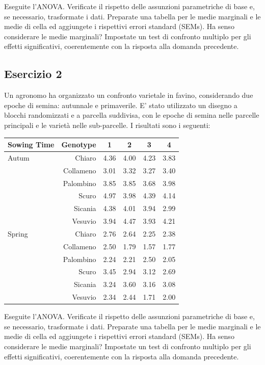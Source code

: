 \documentclass[a4paper,12pt,oneside]{book}
\begin{document}
Eseguite l'ANOVA. Verificate il rispetto delle assunzioni parametriche di base e, se necessario, trasformate i dati. Preparate una tabella per le medie marginali e le medie di cella ed aggiungete i rispettivi errori standard (SEMs). Ha senso considerare le medie marginali? Impostate un test di confronto multiplo per gli effetti significativi, coerentemente con la risposta alla domanda precedente.

\hypertarget{esercizio-2-8}{%
\subsection{Esercizio 2}\label{esercizio-2-8}}

Un agronomo ha organizzato un confronto varietale in favino, considerando due epoche di semina: autunnale e primaverile. E' stato utilizzato un disegno a blocchi randomizzati e a parcella suddivisa, con le epoche di semina nelle parcelle principali e le varietà nelle sub-parcelle. I risultati sono i seguenti:

\begin{longtable}[]{@{}lrcccc@{}}
\toprule
Sowing Time & Genotype & 1 & 2 & 3 & 4 \\
\midrule
\endhead
Autum & Chiaro & 4.36 & 4.00 & 4.23 & 3.83 \\
& Collameno & 3.01 & 3.32 & 3.27 & 3.40 \\
& Palombino & 3.85 & 3.85 & 3.68 & 3.98 \\
& Scuro & 4.97 & 3.98 & 4.39 & 4.14 \\
& Sicania & 4.38 & 4.01 & 3.94 & 2.99 \\
& Vesuvio & 3.94 & 4.47 & 3.93 & 4.21 \\
Spring & Chiaro & 2.76 & 2.64 & 2.25 & 2.38 \\
& Collameno & 2.50 & 1.79 & 1.57 & 1.77 \\
& Palombino & 2.24 & 2.21 & 2.50 & 2.05 \\
& Scuro & 3.45 & 2.94 & 3.12 & 2.69 \\
& Sicania & 3.24 & 3.60 & 3.16 & 3.08 \\
& Vesuvio & 2.34 & 2.44 & 1.71 & 2.00 \\
\bottomrule
\end{longtable}

Eseguite l'ANOVA. Verificate il rispetto delle assunzioni parametriche di base e, se necessario, trasformate i dati. Preparate una tabella per le medie marginali e le medie di cella ed aggiungete i rispettivi errori standard (SEMs). Ha senso considerare le medie marginali? Impostate un test di confronto multiplo per gli effetti significativi, coerentemente con la risposta alla domanda precedente.
\end{document}
